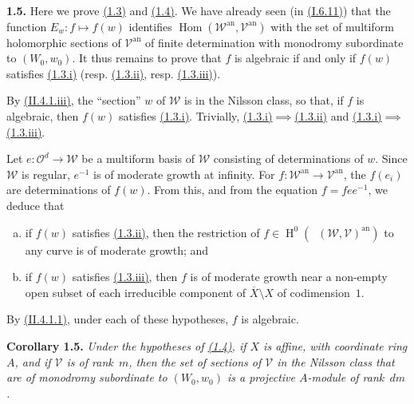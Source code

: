 \documentclass{report}
\newenvironment{itenv}[1]
  {\phantomsection\par\medskip\noindent\textbf{#1.}\itshape}
  {\medskip}
\newenvironment{rmenv}[1]
  {\phantomsection\par\medskip\noindent\textbf{#1.}\rmfamily}
  {\medskip}
\newcommand{\scr}[1]{{\mathscr{#1}}}
\renewcommand{\cal}[1]{{\mathcal{#1}}}
\newcommand{\an}{\mathrm{an}}
\DeclareMathOperator{\Hom}{Hom}
\DeclareMathOperator{\shHom}{\underline{Hom}}
\DeclareMathOperator{\HH}{H}
\newcommand{\oldpage}[1]{\marginpar{\footnotesize$\Big\vert$ \textit{p.~#1}}}
\begin{document}
\begin{rmenv}{1.5}
\label{III.1.5proof}
  Here we prove \hyperref[III.1.3]{(1.3)} and \hyperref[III.1.4]{(1.4)}.
  We have already seen (in \hyperref[I.6.11]{(I.6.11)}) that the function $E_w\colon f\mapsto f(w)$ identifies $\Hom(\scr{W}^\an,\cal{V}^\an)$ with the set of multiform holomorphic sections of $\cal{V}^\an$ of finite determination with monodromy subordinate to $(W_0,w_0)$.
  It thus remains to prove that $f$ is algebraic if and only if $f(w)$ satisfies \hyperref[III.1.3]{(1.3.i)} (resp. \hyperref[III.1.3]{(1.3.ii)}, resp. \hyperref[III.1.3]{(1.3.iii)}).

  By \hyperref[II.4.1]{(II.4.1.iii)}, the ``section'' $w$ of $\scr{W}$ is in the Nilsson class, so that, if $f$ is algebraic, then $f(w)$ satisfies \hyperref[III.1.3]{(1.3.i)}.
  Trivially, \mbox{\hyperref[III.1.3]{(1.3.i)}$\implies$\hyperref[III.1.3]{(1.3.ii)}} and \mbox{\hyperref[III.1.3]{(1.3.i)}$\implies$\hyperref[III.1.3]{(1.3.iii)}}.

  Let $e\colon\cal{O}^d\to\scr{W}$ be a multiform basis of $\scr{W}$ consisting of determinations of $w$.
  Since $\scr{W}$ is regular, $e^{-1}$ is of moderate growth at infinity.
  For $f\colon\scr{W}^\an\to\cal{V}^\an$, the $f(e_i)$ are determinations of $f(w)$.
  From this, and from the equation $f=fee^{-1}$, we deduce that
\oldpage{124}
  \begin{enumerate}[a)]
    \item if $f(w)$ satisfies \hyperref[III.1.3]{(1.3.ii)}, then the restriction of $f\in\HH^0(\shHom(\scr{W},\cal{V})^\an)$ to any curve is of moderate growth; and
    \item if $f(w)$ satisfies \hyperref[III.1.3]{(1.3.iii)}, then $f$ is of moderate growth near a non-empty open subset of each irreducible component of $\overline{X}\setminus X$ of codimension~$1$.
  \end{enumerate}
\end{rmenv}

By \hyperref[II.4.1.1]{(II.4.1.1)}, under each of these hypotheses, $f$ is algebraic.

\begin{itenv}{Corollary 1.5}
\label{III.1.5}
  Under the hypotheses of \hyperref[III.1.4]{(1.4)}, if $X$ is affine, with coordinate ring $A$, and if $\cal{V}$ is of rank~$m$, then the set of sections of $\cal{V}$ in the Nilsson class that are of monodromy subordinate to $(W_0,w_0)$ is a \emph{projective} $A$-module of rank~$dm$.
\end{itenv}
\end{document}
